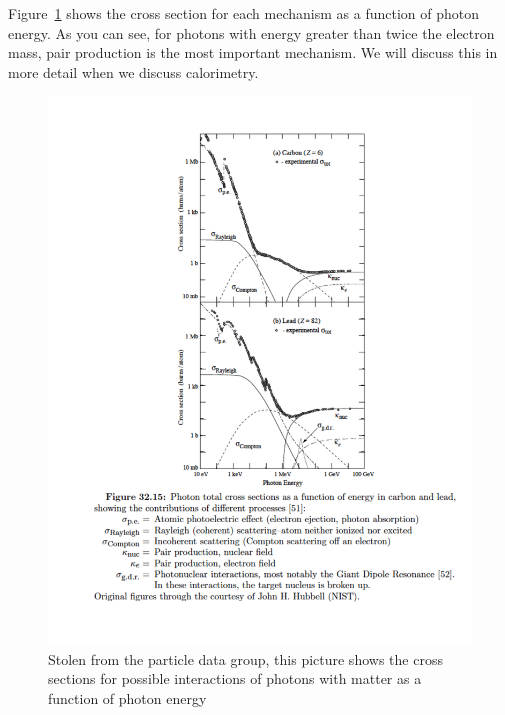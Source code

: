 Figure~\ref{fig:photoninteractions} shows the cross section for each mechanism as a 
function of photon energy.  As you can see, for photons with energy greater than twice the 
electron mass, pair production is the most important mechanism.  We will discuss this in more detail when we discuss calorimetry.


\begin{figure}[h]
\centering\includegraphics[scale=0.5]{./particleinteractions/Pictures/photoninteractions.pdf}
\caption{Stolen from the particle data group, this picture shows the cross sections for possible interactions of photons with matter as a function of photon energy }
\label{fig:photoninteractions}
\end{figure}

